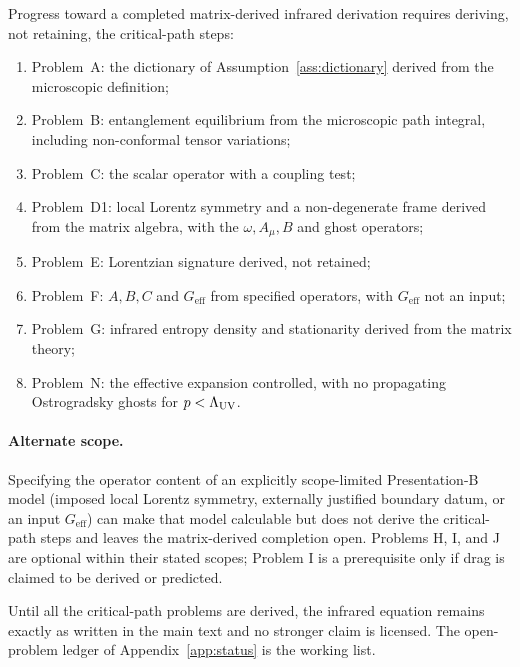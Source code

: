 Progress toward a completed matrix-derived infrared derivation requires
deriving, not retaining, the critical-path steps:
\begin{enumerate}
  \item Problem~A: the dictionary of Assumption~\ref{ass:dictionary}
        derived from the microscopic definition;
  \item Problem~B: entanglement equilibrium from the microscopic
        path integral, including non-conformal tensor variations;
  \item Problem~C: the scalar operator with a coupling test;
  \item Problem~D1: local Lorentz symmetry and a non-degenerate frame
        derived from the matrix algebra, with the
        \(\omega,A_\mu,B\) and ghost operators;
  \item Problem~E: Lorentzian signature derived, not retained;
  \item Problem~F: \(A,B,C\) and \(G_{\mathrm{eff}}\) from specified
        operators, with \(G_{\mathrm{eff}}\) not an input;
  \item Problem~G: infrared entropy density and stationarity derived
        from the matrix theory;
  \item Problem~N: the effective expansion controlled, with no
        propagating Ostrogradsky ghosts for \(p<\Lambda_{\mathrm{UV}}\).
\end{enumerate}

\paragraph{Alternate scope.}
Specifying the operator content of an explicitly scope-limited
Presentation-B model (imposed local Lorentz symmetry, externally
justified boundary datum, or an input \(G_{\mathrm{eff}}\)) can make
that model calculable but does not derive the critical-path steps and
leaves the matrix-derived completion open. Problems H, I, and J
are optional within their stated scopes; Problem I is a prerequisite
only if drag is claimed to be derived or predicted.

Until all the critical-path problems are derived, the infrared equation
remains exactly as written in the main text and no stronger claim is
licensed. The open-problem ledger of Appendix~\ref{app:status} is the
working list.